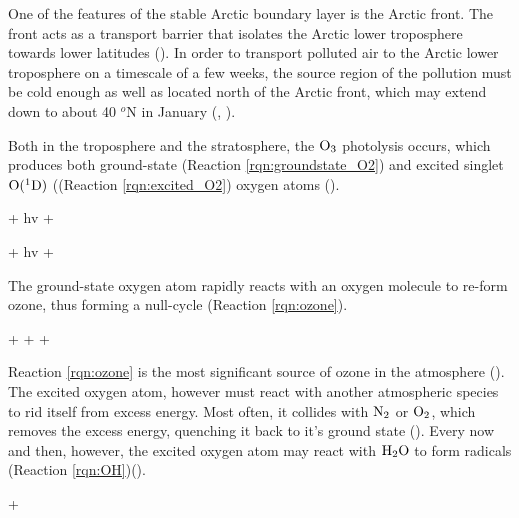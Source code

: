 \medskip

One of the features of the stable Arctic boundary layer is the Arctic front. The front acts as a transport barrier that isolates the Arctic lower troposphere towards lower latitudes (\cite{BARRIE1986643}). In order to transport polluted air to the Arctic lower troposphere on a timescale of a few weeks, the source region of the pollution must be cold enough as well as located north of the Arctic front, which may extend down to about 40 $^o$N in January (\cite{BARRIE1986643}, \cite{AMAP2015}). 


\medskip

Both in the troposphere and the stratosphere, the $\mathrm{O_3}$ photolysis occurs, which produces both ground-state  (Reaction \ref{rqn:groundstate_O2}) and excited singlet $\mathrm{O(^1D)}$ ((Reaction \ref{rqn:excited_O2}) oxygen atoms (\cite{SeinfeldSpyros}).

\begin{reaction}
     + hv \rightarrow {} + 
    \label{rqn:groundstate_O2}
\end{reaction}

\begin{reaction}
     + hv \rightarrow {} + 
    \label{rqn:excited_O2}
\end{reaction}

The ground-state oxygen atom rapidly reacts with an oxygen molecule to re-form ozone, thus forming a null-cycle (Reaction \ref{rqn:ozone}).

\begin{reaction}
     +  +  \rightarrow {} + 
    \label{rqn:ozone}
\end{reaction}

Reaction \ref{rqn:ozone} is the most significant source of ozone in the atmosphere (\cite{SeinfeldSpyros}). The excited oxygen atom, however must react with another atmospheric species to rid itself from excess energy. Most often, it collides with $\mathrm{N_2}$ or $\mathrm{O_2}$, which removes the excess energy, quenching it back to it's ground state (\cite{Levy1971}). Every now and then, however, the excited oxygen atom may react with $\mathrm{H_2O}$ to form  radicals (Reaction \ref{rqn:OH})(\cite{SeinfeldSpyros}). 

\begin{reaction}
     +  
    \label{rqn:OH}
\end{reaction}

